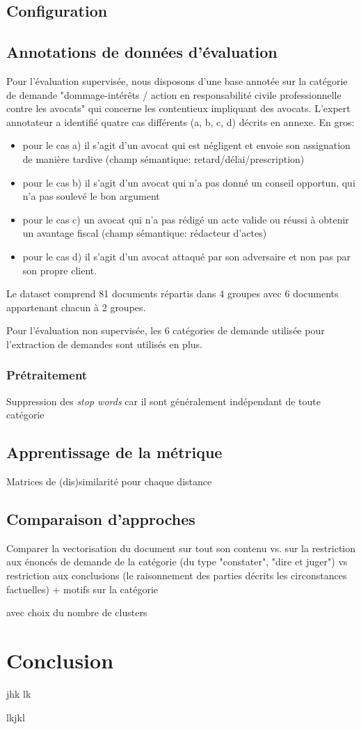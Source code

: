 \subsection{Configuration}

\subsection{Annotations de données d'évaluation}
Pour l'évaluation supervisée, nous disposons d'une base annotée sur la catégorie de demande "dommage-intérêts / action en responsabilité civile professionnelle contre les avocats" qui concerne les contentieux impliquant des avocats.
L'expert annotateur a identifié quatre cas différents (a, b, c, d) décrits en annexe. En gros:
\begin{itemize}
\item pour le cas a) il s'agit d'un avocat qui est négligent et envoie son assignation de manière tardive (champ sémantique: retard/délai/prescription)
\item pour le cas b) il s'agit d'un avocat qui n'a pas donné un conseil opportun, qui n'a pas soulevé le bon argument
\item pour le cas c) un avocat qui n'a pas rédigé un acte valide ou réussi à obtenir un avantage fiscal (champ sémantique: rédacteur d'actes)
\item pour le cas d) il s'agit d'un avocat attaqué par son adversaire et non pas par son propre client.
\end{itemize}

Le dataset comprend 81 documents répartis dans 4 groupes avec 6 documents appartenant chacun à 2 groupes.

Pour l'évaluation non supervisée, les 6 catégories de demande utilisée pour l'extraction de demandes sont utilisés en plus.

\subsubsection{Prétraitement}
Suppression des \textit{stop words} car il sont généralement indépendant de toute catégorie

\subsection{Apprentissage de la métrique}
Matrices de (dis)similarité pour chaque distance

\subsection{Comparaison d'approches}
Comparer la vectorisation du document sur tout son contenu vs. sur la restriction aux énoncés de demande de la catégorie (du type "constater", "dire et juger") vs restriction aux conclusions (le raisonnement des parties décrits les circonstances factuelles) + motifs sur la catégorie

avec choix du nombre de clusters


\section{Conclusion}
\label{sec:similarite:conclusion}
jhk
lk

lkjkl